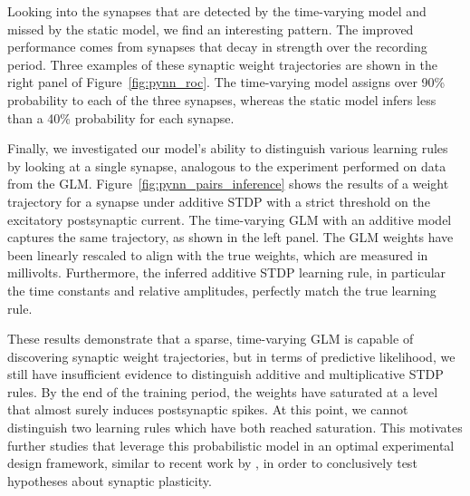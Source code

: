 Looking into the synapses that are detected by the time-varying model
and missed by the static model, we find an interesting pattern. The
improved performance comes from synapses that decay in strength over
the recording period. Three examples of these synaptic weight
trajectories are shown in the right panel of
Figure~\ref{fig:pynn_roc}. The time-varying model assigns over 90\%
probability to each of the three synapses, whereas the static model
infers less than a 40\% probability for each synapse.

Finally, we investigated our model's ability to distinguish various
learning rules by looking at a single synapse, analogous to the
experiment performed on data from the
GLM. Figure~\ref{fig:pynn_pairs_inference} shows the results of a
weight trajectory for a synapse under additive STDP with a strict
threshold on the excitatory postsynaptic current. The time-varying GLM
with an additive model captures the same trajectory, as shown in the
left panel. The GLM weights have been linearly rescaled to align with
the true weights, which are measured in millivolts. Furthermore, the
inferred additive STDP learning rule, in particular the time constants
and relative amplitudes, perfectly match the true learning rule.

These results demonstrate that a sparse, time-varying GLM is capable
of discovering synaptic weight trajectories, but in terms of
predictive likelihood, we still have insufficient evidence to
distinguish additive and multiplicative STDP rules.
By the end of the training period, the weights have saturated at a
level that almost surely induces postsynaptic spikes. At this point,
we cannot distinguish two learning rules which have both reached
saturation.  This motivates further studies that leverage this
probabilistic model in an optimal experimental design framework,
similar to recent work by \citet{Shababo-2013}, in order to
conclusively test hypotheses about synaptic plasticity.


